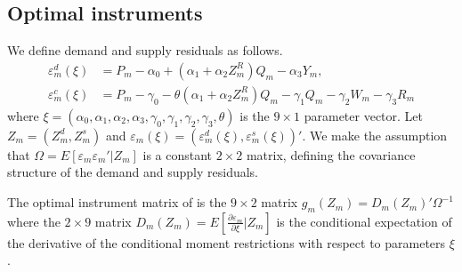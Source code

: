 \documentclass[11pt, a4paper]{article}
\begin{document}
\subsection{Optimal instruments}
We define demand and supply residuals as follows.
\begin{align*}
    \varepsilon^{d}_{m}(\xi) &= P_m - \alpha_0 + (\alpha_1 + \alpha_2Z^{R}_{m})Q_{m} - \alpha_3 Y_m,\\
    \varepsilon^c_m(\xi) &= P_{m} - \gamma_0 - \theta (\alpha_1 + \alpha_2 Z^{R}_m)Q_{m} - \gamma_1 Q_{m} - \gamma_2 W_m - \gamma_3 R_{m}
\end{align*}
where $\xi=\left(\alpha_0, \alpha_1, \alpha_2, \alpha_3, \gamma_0, \gamma_1, \gamma_2, \gamma_3, \theta\right)$ is the $9\times 1$ parameter vector. 
Let $Z_{m}=(Z_{m}^{d},Z_{m}^{s})$ and $\varepsilon_{m}(\xi)=(\varepsilon_{m}^{d}(\xi),\varepsilon_{m}^{s}(\xi))'$.
We make the assumption that $\Omega=E[\varepsilon_{m}\varepsilon_{m}'|Z_{m}]$ is a constant $2\times 2$ matrix, defining the covariance structure of the demand and supply residuals.
 
The optimal instrument matrix of \cite{chamberlain1987asymptotic} is the $9\times 2$ matrix $g_{m}(Z_{m})=D_{m}(Z_{m})'\Omega^{-1}$
where the $2\times 9$ matrix $D_{m}(Z_{m})=E\left[\frac{\partial \varepsilon_{m}}{\partial \xi}| Z_{m}\right]$ is the conditional expectation of the derivative of the conditional moment restrictions with respect to parameters $\xi$. 
\end{document}
